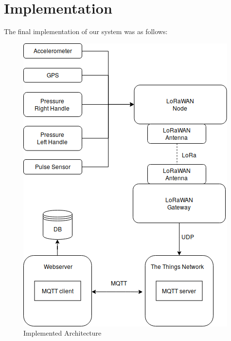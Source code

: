 \chapter{Implementation}
\label{cha:implementation}

The final implementation of our system was as follows:
\begin{figure}[h]
\centering
\includegraphics[width=1\linewidth]{gfx/architecture_implementation_h}
\caption{Implemented Architecture}
\label{fig:image2}
\end{figure}

